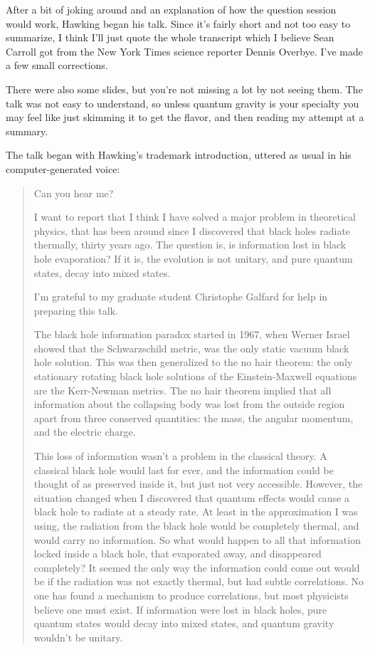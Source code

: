 After a bit of joking around and an explanation of how the question
session would work, Hawking began his talk.  Since it's fairly short 
and not too easy to summarize, I think I'll just quote the whole 
transcript which I believe Sean Carroll got from the New York Times 
science reporter Dennis Overbye.  I've made a few small corrections.  

There were also some slides, but you're not missing a lot by not seeing
them.  The talk was not easy to understand, so unless quantum gravity is
your specialty you may feel like just skimming it to get the flavor, and
then reading my attempt at a summary.  

The talk began with Hawking's trademark introduction, uttered as usual 
in his computer-generated voice:

\begin{quote}
     Can you hear me?

     I want to report that I think I have solved a major problem in
     theoretical physics, that has been around since I discovered that
     black holes radiate thermally, thirty years ago. The question is, 
     is information lost in black hole evaporation?  If it is, the 
     evolution is not unitary, and pure quantum states, decay into 
     mixed states.

     I'm grateful to my graduate student Christophe Galfard for help in
     preparing this talk.

     The black hole information paradox started in 1967, when Werner
     Israel showed that the Schwarzschild metric, was the only static
     vacuum black hole solution. This was then generalized to the no hair
     theorem: the only stationary rotating black hole solutions of the
     Einstein-Maxwell equations are the Kerr-Newman metrics. The no hair
     theorem implied that all information about the collapsing body was
     lost from the outside region apart from three conserved quantities:
     the mass, the angular momentum, and the electric charge.

     This loss of information wasn't a problem in the classical theory. A
     classical black hole would last for ever, and the information could 
     be thought of as preserved inside it, but just not very accessible. 
     However, the situation changed when I discovered that quantum effects 
     would cause a black hole to radiate at a steady rate.  At least in 
     the approximation I was using, the radiation from the black hole would 
     be completely thermal, and would carry no information.  So what would 
     happen to all that information locked inside a black hole, that 
     evaporated away, and disappeared completely?  It seemed the only way 
     the information could come out would be if the radiation was not exactly 
     thermal, but had subtle correlations.  No one has found a mechanism 
     to produce correlations, but most physicists believe one must exist.  
     If information were lost in black holes, pure quantum states would 
     decay into mixed states, and quantum gravity wouldn't be unitary.


\end{quote}

